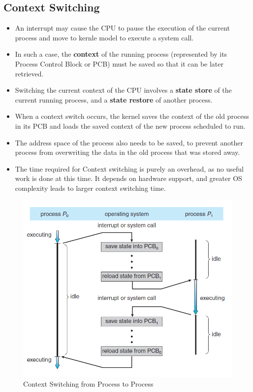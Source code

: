 \documentclass{article}
\theoremstyle{plain}
\theoremstyle{definition}
\begin{document}
\subsection{Context Switching}
\begin{itemize}
    \item An interrupt may cause the CPU to pause the execution of the current process and move to kernle model to execute a system call.
    
    \item In such a case, the \textbf{context} of the running process (represented by its Process Control Block or PCB) must be saved so that it can be later retrieved. 
    
    \item Switching the current context of the CPU involves a \textbf{state store} of the current running process, and a \textbf{state restore} of another process. 
    
    \item When a context switch occurs, the kernel saves the context of the old process in its PCB and loads the saved context of the new process scheduled to run.
    
    \item The address space of the process also needs to be saved, to prevent another process from overwriting the data in the old process that was stored away. 
    
    \item The time required for Context switching is purely an overhead, as no useful work is done at this time. It depends on hardware support, and greater OS complexity leads to larger context switching time. 
\end{itemize}

\begin{figure}[ht]
    \centering
    \includegraphics[scale=0.6]{os14.png}
    \caption{Context Switching from Process to Process}
    \label{fig:my_label_xx}
\end{figure}
\end{document}
